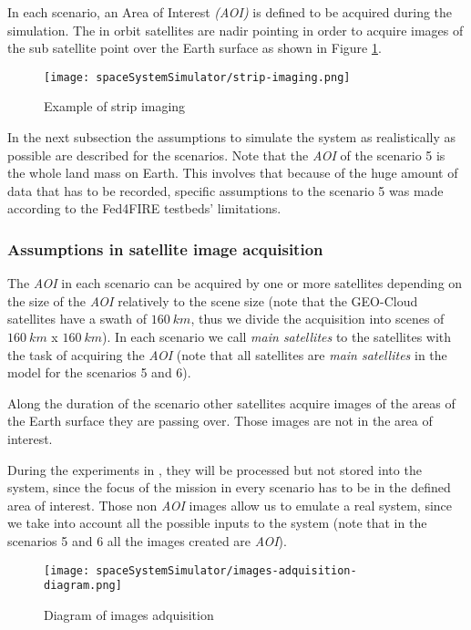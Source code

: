 In each scenario, an Area of Interest \emph{(AOI)} is defined to be acquired
during the simulation. The in orbit satellites are nadir pointing in order to acquire images of the sub satellite point over the Earth surface as shown in Figure \ref{fig:sss-example-strip}.
\begin{figure}[!h]
\begin{center}
\texttt{[image: spaceSystemSimulator/strip-imaging.png]}
\caption{Example of strip imaging}
\label{fig:sss-example-strip}
  \end{center}
\end{figure}

In the next subsection the assumptions to simulate the system as realistically
as possible are described for the scenarios. Note that the \emph{AOI} of the scenario 5 is the whole land mass on Earth. This involves that because of the huge amount of data that has to be recorded, specific assumptions to the scenario 5 was made according to the Fed4FIRE testbeds’ limitations.

\subsubsection{Assumptions in satellite image acquisition}
\label{subsubsec:assumptions}

The \emph{AOI} in each scenario can be acquired by one or more satellites depending on
the size of the \emph{AOI} relatively to the scene size (note that the GEO-Cloud
satellites have a swath of $160~km$, thus we divide the acquisition into scenes of
$160~km$ x $160~km$).
In each scenario we call \emph{main satellites} to the satellites with the task
of acquiring the \emph{AOI} (note that all satellites are \emph{main satellites} in the
model for the scenarios 5 and 6).

Along the duration of the scenario other satellites acquire images of the areas
of the Earth surface they are passing over. Those images are not in the area of
interest.

During the experiments in \bonfire, they will be processed but not stored into the system, since the focus of the mission in every scenario has to be in the defined area of interest. Those non \emph{AOI} images allow us to emulate a real system, since we take into account all the possible inputs to the system (note that in the scenarios 5 and 6 all the images created are \emph{AOI}).


\begin{figure}[!h]
\begin{center}
\texttt{[image: spaceSystemSimulator/images-adquisition-diagram.png]}
\caption{Diagram of images adquisition}
\label{fig:sss-acquisition-diagram}
\end{center}
\end{figure}

